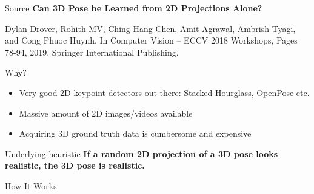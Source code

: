 \documentclass[8pt]{beamer}
\begin{document}
	\begin{frame}{Source}
		\textbf{Can 3D Pose be Learned from 2D Projections Alone?}\linebreak
		\begin{footnotesize}
			Dylan Drover, Rohith MV, Ching-Hang Chen, Amit Agrawal, Ambrish Tyagi, and Cong Phuoc Huynh.\linebreak
			In Computer Vision -- ECCV 2018 Workshops, Pages 78-94, 2019. Springer International Publishing.
		\end{footnotesize}
	\end{frame}

	\begin{frame}{Why?}
		\begin{itemize}
			\item Very good 2D keypoint detectors out there: Stacked Hourglass, OpenPose etc.
			\item Massive amount of 2D images/videos available
			\item Acquiring 3D ground truth data is cumbersome and expensive
		\end{itemize}
	\end{frame}

	\begin{frame}{Underlying heuristic}
		\textbf{If a random 2D projection of a 3D pose looks realistic, the 3D pose is realistic.}
	\end{frame}

	\begin{frame}{How It Works}
		\begin{figure}
			\centering
		\end{figure}
	\end{frame}
\end{document}
